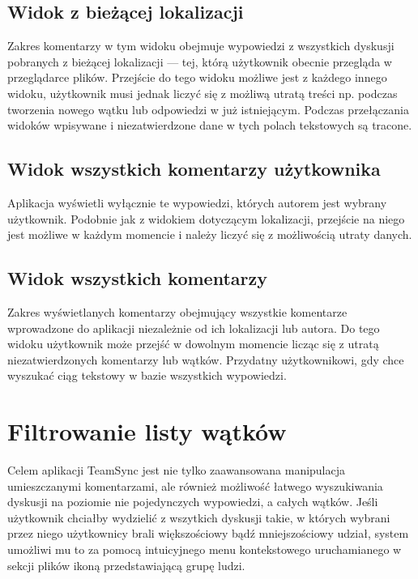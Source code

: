 \subsection*{Widok z bieżącej lokalizacji}
  
Zakres komentarzy w tym widoku obejmuje wypowiedzi z wszystkich dyskusji pobranych z bieżącej lokalizacji --- tej, którą użytkownik obecnie przegląda w przeglądarce plików. Przejście do tego widoku możliwe jest z każdego innego widoku, użytkownik musi jednak liczyć się z możliwą utratą treści np. podczas tworzenia nowego wątku lub odpowiedzi w już istniejącym. Podczas przełączania widoków wpisywane i niezatwierdzone dane w tych polach tekstowych są tracone.

\subsection*{Widok wszystkich komentarzy użytkownika}

Aplikacja wyświetli wyłącznie te wypowiedzi, których autorem jest wybrany użytkownik. Podobnie jak z widokiem dotyczącym lokalizacji, przejście na niego jest możliwe w każdym momencie i należy liczyć się z możliwością utraty danych.

\subsection*{Widok wszystkich komentarzy}

Zakres wyświetlanych komentarzy obejmujący wszystkie komentarze wprowadzone do aplikacji niezależnie od ich lokalizacji lub autora. Do tego widoku użytkownik może przejść w dowolnym momencie licząc się z utratą niezatwierdzonych komentarzy lub wątków. Przydatny użytkownikowi, gdy chce wyszukać ciąg tekstowy w bazie wszystkich wypowiedzi.

\section{Filtrowanie listy wątków}

\label{threadfiltering}

Celem aplikacji TeamSync jest nie tylko zaawansowana manipulacja umieszczanymi komentarzami, ale również możliwość łatwego wyszukiwania dyskusji na poziomie nie pojedynczych wypowiedzi, a całych wątków. Jeśli użytkownik chciałby wydzielić z wszytkich dyskusji takie, w których wybrani przez niego użytkownicy brali większościowy bądź mniejszościowy udział, system umożliwi mu to za pomocą intuicyjnego menu kontekstowego uruchamianego w sekcji plików ikoną przedstawiającą grupę ludzi.

